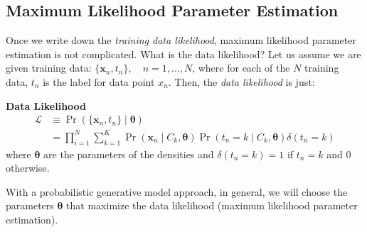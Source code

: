 \documentclass[11pt]{article}
\newcommand{\xb}{\mathbf{x}}
\newenvironment{propertybox}{%
   \def\FrameCommand{\colorbox{LightSteelBlue}}%
   \MakeFramed{\advance\hsize-\width \FrameRestore}}
 {\endMakeFramed}
\begin{document}
\subsection{Maximum Likelihood Parameter Estimation}
Once we write down the \textit{training data likelihood}, maximum likelihood parameter estimation is not complicated. What is the data likelihood? Let us assume we are given training data: $\lbrace \xb_n, t_n \rbrace, \quad n = 1, \ldots, N$, where for each of the $N$ training data, $t_n$ is the label for data point $x_n$. Then, the \textit{data likelihood} is just:
\begin{center}
\begin{minipage}{0.75\linewidth}
\begin{propertybox}
    \textbf{Data Likelihood}
    \begin{equation}
    	\begin{split}
	    	\mathcal{L} &\equiv \Pr \left( \lbrace\xb_n, t_n\rbrace \mid \symbf{\theta} \right)  \\
		 	&= \prod_{i=1}^{N} \sum_{k=1}^K \Pr \left( \xb_n \mid C_k , \symbf{\theta} \right) \Pr \left( t_n = k \mid C_k, \symbf{\theta}\right) \delta(t_n = k)
	\end{split}
    \end{equation}
    where $\symbf{\theta}$ are the parameters of the densities and $\delta(t_n = k) = 1$ if $t_n = k$ and $0$ otherwise.
\end{propertybox}
\end{minipage}
\end{center}

 
With a probabilistic generative model approach, in general, we will choose the parameters $\symbf{\theta}$ that maximize the data likelihood (maximum likelihood parameter estimation).
\end{document}

